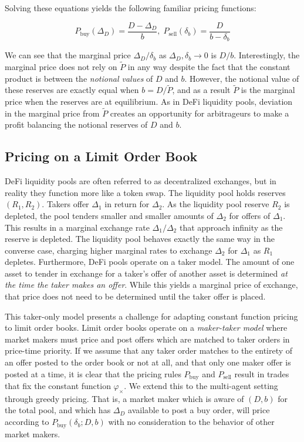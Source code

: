 \documentclass{article}
\begin{document}
Solving these equations yields the following familiar pricing functions:

\begin{equation}
P_{\mathrm{buy}}(\Delta_D) = \frac{D - \Delta_D}{b}, \;
P_{\mathrm{sell}}(\delta_b) = \frac{D}{b - \delta_b}
\end{equation}

We can see that the marginal price $\Delta_D / \delta_b$ as $\Delta_D, \delta_b \rightarrow 0$ is $D / b$. Interestingly, the marginal price does not rely on $\tilde{P}$ in any way despite the fact that the constant product is between the \emph{notional values} of $D$ and $b$. However, the notional value of these reserves are exactly equal when $b = D / \tilde{P}$, and as a result $\tilde{P}$ is the marginal price when the reserves are at equilibrium. As in DeFi liquidity pools, deviation in the marginal price from $\tilde{P}$ creates an opportunity for arbitrageurs to make a profit balancing the notional reserves of $D$ and $b$.

\subsection{Pricing on a Limit Order Book}

DeFi liquidity pools are often referred to as decentralized exchanges, but in reality they function more like a token swap. The liquidity pool holds reserves $(R_1, R_2)$. Takers offer $\Delta_1$ in return for $\Delta_2$. As the liquidity pool reserve $R_2$ is depleted, the pool tenders smaller and smaller amounts of $\Delta_2$ for offers of $\Delta_1$. This results in a marginal exchange rate $\Delta_1 / \Delta_2$ that approach infinity as the reserve is depleted. The liquidity pool behaves exactly the same way in the converse case, charging higher marginal rates to exchange $\Delta_2$ for $\Delta_1$ as $R_1$ depletes. Furthermore, DeFi pools operate on a taker model. The amount of one asset to tender in exchange for a taker's offer of another asset is determined \emph{at the time the taker makes an offer}. While this yields a marginal price of exchange, that price does not need to be determined until the taker offer is placed.

This taker-only model presents a challenge for adapting constant function pricing to limit order books. Limit order books operate on a \emph{maker-taker model} where market makers must price and post offers which are matched to taker orders in price-time priority. If we assume that any taker order matches to the entirety of an offer posted to the order book or not at all, and that only one maker offer is posted at a time, it is clear that the pricing rules $P_{\mathrm{buy}}$ and $P_{\mathrm{sell}}$ result in trades that fix the constant function $\varphi_{\times}$. We extend this to the multi-agent setting through greedy pricing. That is, a market maker which is aware of $(D, b)$ for the total pool, and which has $\Delta_D$ available to post a buy order, will price according to $P_{\mathrm{buy}}(\delta_b; D, b)$ with no consideration to the behavior of other market makers.
\end{document}
